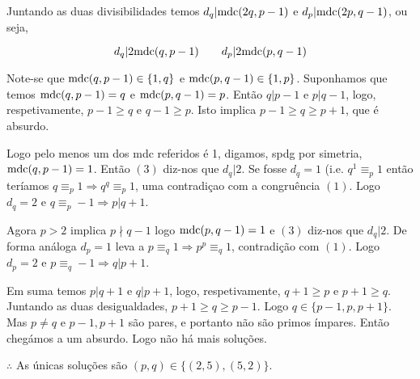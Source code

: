 \documentclass[main.tex]{subfiles}
\begin{document}
\begin{solution}
Juntando as duas divisibilidades temos $d_q|\text{mdc}(2q,p-1)$ e $d_p|\text{mdc}(2p,q-1)$, ou seja,

\begin{equation}
d_q|2\text{mdc}(q,p-1)\qquad d_p|2\text{mdc}(p,q-1)
\end{equation}

Note-se que $\text{mdc}(q,p-1)\in\{1,q\}$ e $\text{mdc}(p,q-1)\in\{1,p\}$.
Suponhamos que temos $\text{mdc}(q,p-1)=q$ e $\text{mdc}(p,q-1)=p$.
Então $q|p-1$ e $p|q-1$, logo, respetivamente, $p-1\geq q$ e $q-1\geq p$.
Isto implica $p-1\geq q\geq p+1$, que é absurdo.

Logo pelo menos um dos mdc referidos é 1, digamos, spdg por simetria, $\text{mdc}(q,p-1)=1$.
Então $(3)$ diz-nos que $d_q|2$.
Se fosse $d_q=1$ (i.e. $q^1\equiv_p 1$ então teríamos $q\equiv_p 1\Rightarrow q^q\equiv_p 1$, uma contradiçao com a congruência $(1)$.
Logo $d_q=2$ e $q\equiv_p -1\Rightarrow p|q+1$.

Agora $p>2$ implica $p\nmid q-1$ logo $\text{mdc}(p,q-1)=1$ e $(3)$ diz-nos que $d_q|2$. De forma análoga $d_p=1$ leva a $p\equiv_q 1\Rightarrow p^p\equiv_q 1$, contradição com $(1)$. Logo $d_p=2$ e $p\equiv_q -1\Rightarrow q|p+1$.

Em suma temos $p|q+1$ e $q|p+1$, logo, respetivamente, $q+1\geq p$ e $p+1\geq q$.
Juntando as duas desigualdades, $p+1\geq q\geq p-1$.
Logo $q\in\{p-1,p,p+1\}$.
Mas $p\neq q$ e $p-1,p+1$ são pares, e portanto não são primos ímpares. Então chegámos a um absurdo. Logo não há mais soluções.

$\therefore$ As únicas soluções são $(p,q)\in\{(2,5),(5,2)\}$.
\end{solution}
\end{document}
